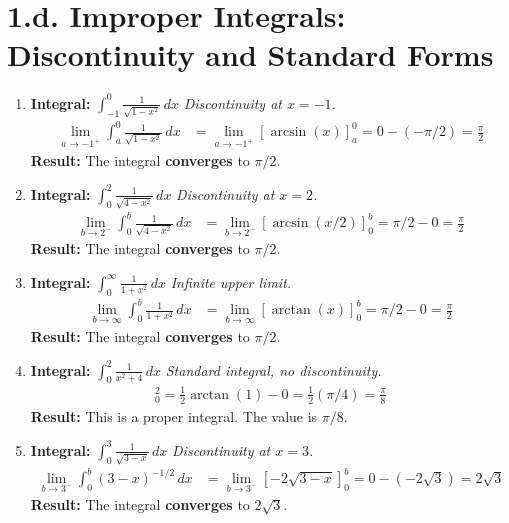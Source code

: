 \documentclass[12pt]{article}
\newcommand{\problemsettitle}[1]{\section*{#1}}
\begin{document}
\newpage
\problemsettitle{1.d. Improper Integrals: Discontinuity and Standard Forms}
\begin{enumerate}
    \item \textbf{Integral: } $\displaystyle \int_{-1}^{0} \frac{1}{\sqrt{1-x^2}} \,dx$
    \textit{Discontinuity at $x=-1$.}
    \begin{align*}
        \lim_{a \to -1^+} \int_{a}^{0} \frac{1}{\sqrt{1-x^2}} \,dx &= \lim_{a \to -1^+} [\arcsin(x)]_a^0 = 0 - (-\pi/2) = \frac{\pi}{2}
    \end{align*}
    \textbf{Result:} The integral \textbf{converges} to $\pi/2$.

    \item \textbf{Integral: } $\displaystyle \int_{0}^{2} \frac{1}{\sqrt{4-x^2}} \,dx$
    \textit{Discontinuity at $x=2$.}
    \begin{align*}
        \lim_{b \to 2^-} \int_{0}^{b} \frac{1}{\sqrt{4-x^2}} \,dx &= \lim_{b \to 2^-} [\arcsin(x/2)]_0^b = \pi/2 - 0 = \frac{\pi}{2}
    \end{align*}
    \textbf{Result:} The integral \textbf{converges} to $\pi/2$.

    \item \textbf{Integral: } $\displaystyle \int_{0}^{\infty} \frac{1}{1+x^2} \,dx$
    \textit{Infinite upper limit.}
    \begin{align*}
        \lim_{b \to \infty} \int_{0}^{b} \frac{1}{1+x^2} \,dx &= \lim_{b \to \infty} [\arctan(x)]_0^b = \pi/2 - 0 = \frac{\pi}{2}
    \end{align*}
    \textbf{Result:} The integral \textbf{converges} to $\pi/2$.

    \item \textbf{Integral: } $\displaystyle \int_{0}^{2} \frac{1}{x^2+4} \,dx$
    \textit{Standard integral, no discontinuity.}
    \begin{align*}
         [\frac{1}{2}\arctan(x/2)]_0^2 = \frac{1}{2}\arctan(1) - 0 = \frac{1}{2}(\pi/4) = \frac{\pi}{8}
    \end{align*}
    \textbf{Result:} This is a proper integral. The value is $\pi/8$.

    \item \textbf{Integral: } $\displaystyle \int_{0}^{3} \frac{1}{\sqrt{3-x}} \,dx$
    \textit{Discontinuity at $x=3$.}
    \begin{align*}
        \lim_{b \to 3^-} \int_{0}^{b} (3-x)^{-1/2} \,dx &= \lim_{b \to 3^-} [-2\sqrt{3-x}]_0^b = 0 - (-2\sqrt{3}) = 2\sqrt{3}
    \end{align*}
    \textbf{Result:} The integral \textbf{converges} to $2\sqrt{3}$.


\end{enumerate}
\end{document}
